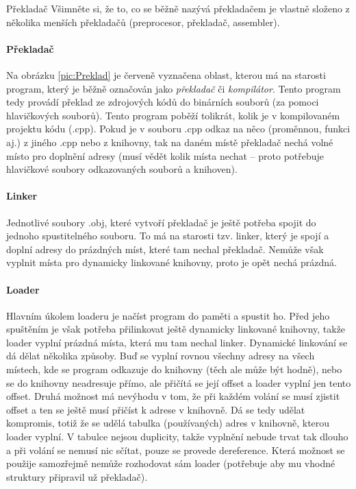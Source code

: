 \begin{definiceN}{Překladač}
Všimněte si, že to, co se běžně nazývá překladačem je vlastně složeno z několika menších překladačů (preprocesor, překladač, assembler).

\paragraph{Překladač}
Na obrázku \ref{pic:Preklad} je červeně vyznačena oblast, kterou má na starosti program, který je běžně označován jako \emph{překladač} či \emph{kompilátor}. Tento program tedy provádí překlad ze zdrojových kódů do binárních souborů (za pomoci hlavičkových souborů). Tento program poběží tolikrát, kolik je v kompilovaném projektu kódu (.cpp). Pokud je v souboru .cpp odkaz na něco (proměnnou, funkci aj.) z jiného .cpp nebo z knihovny, tak na daném místě překladač nechá volné místo pro doplnění adresy (musí vědět kolik místa nechat -- proto potřebuje hlavičkové soubory odkazovaných souborů a knihoven).

\paragraph{Linker}
Jednotlivé soubory .obj, které vytvoří překladač je ještě potřeba spojit do jednoho spustitelného souboru. To má na starosti tzv. linker, který je spojí a doplní adresy do prázdných míst, které tam nechal překladač. Nemůže však vyplnit místa pro dynamicky linkované knihovny, proto je opět nechá prázdná.

\paragraph{Loader}
Hlavním úkolem loaderu je načíst program do paměti a spustit ho. Před jeho spuštěním je však potřeba přilinkovat ještě dynamicky linkované knihovny, takže loader vyplní prázdná místa, která mu tam nechal linker. Dynamické linkování se dá dělat několika způsoby. Buď se vyplní rovnou všechny adresy na všech místech, kde se program odkazuje do knihovny (těch ale může být hodně), nebo se do knihovny neadresuje přímo, ale přičítá se její offset a loader vyplní jen tento offset. Druhá možnost má nevýhodu v tom, že při každém volání se musí zjistit offset a ten se ještě musí přičíst k adrese v knihovně. Dá se tedy udělat kompromis, totiž že se udělá tabulka (používaných) adres v knihovně, kterou loader vyplní. V tabulce nejsou duplicity, takže vyplnění nebude trvat tak dlouho a při volání se nemusí nic sčítat, pouze se provede dereference. Která možnost se použije samozřejmě nemůže rozhodovat sám loader (potřebuje aby mu vhodné struktury připravil už překladač).


\end{definiceN}
